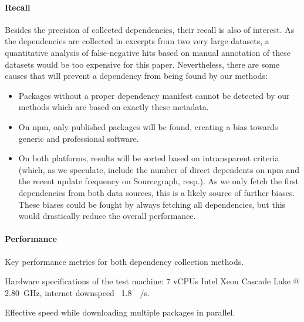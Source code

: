 \paragraph{Recall}
\label{sec:evaluation/resqu1/recall}

Besides the precision of collected dependencies, their recall is also of interest.
As the dependencies are collected in excerpts from two very large datasets, a quantitative analysis of false-negative hits based on manual annotation of these datasets would be too expensive for this paper.
Nevertheless, there are some causes that will prevent a dependency from being found by our methods:

\begin{itemize}
	\item Packages without a proper dependency manifest cannot be detected by our methods which are based on exactly these metadata.
	\item On npm, only published packages will be found, creating a bias towards generic and professional software.
	\item On both platforms, results will be sorted based on intransparent criteria (which, as we speculate, include the number of direct dependents on npm and the recent update frequency on Sourcegraph, resp.).
		As we only fetch the first dependencies from both data sources, this is a likely source of further biases.
		These biases could be fought by always fetching all dependencies, but this would drastically reduce the overall performance.
\end{itemize}

\paragraph{Performance}
\label{sec:evaluation/resqu1/performance}

\begin{table}
	\caption{Key performance metrics for both dependency collection methods.}
	\label{tab:evaluation/resqu1/performance}

	\centering
	\begin{threeparttable}
		\renewcommand\theadfont{\normalsize}
		
		\begin{tablenotes}
			\footnotesize
			\item[\alphtnotetext{1}] Hardware specifications of the test machine: 7 vCPUs Intel Xeon Cascade Lake @ \SI{2.80}{\giga\hertz}, internet downspeed ~\SI{1.8}{\giga\bit/\second}.
			\item[\alphtnotetext{2}] Effective speed while downloading multiple packages in parallel.
		\end{tablenotes}
	\end{threeparttable}
\end{table}

